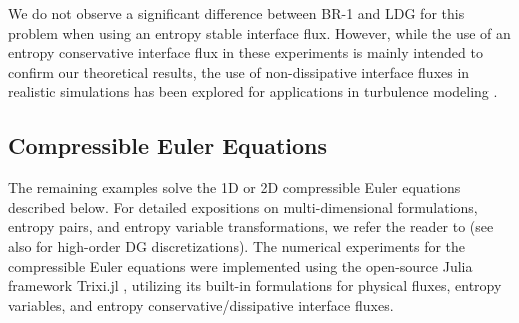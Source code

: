 \documentclass{elsarticle}
\theoremstyle{definition}
\theoremstyle{plain}
\theoremstyle{plain}
\newcommand{\reftwo}[1]{{\color{blue}#1}}
\renewcommand{\reftwo}[1]{#1}
\begin{document}
We do not observe a significant difference between BR-1 and LDG for this problem when using an entropy stable interface flux. However, while the use of an entropy conservative interface flux in these experiments is mainly intended to confirm our theoretical results, the use of non-dissipative interface fluxes in realistic simulations has been explored for applications in turbulence modeling \cite{flad2017use}.


\subsection{Compressible Euler Equations}\label{sec:Compressible Euler Equations}
The remaining examples solve the 1D or 2D compressible Euler equations described below. 
\reftwo{For detailed expositions on multi-dimensional formulations, entropy pairs, and 
entropy variable transformations, we refer the reader to \cite{ harten1983symmetric, hughes1986new, tadmor2003entropy} 
(see also \cite{chan2022entropy} for high-order DG discretizations). The numerical experiments for the compressible Euler equations were implemented using the open-source Julia framework Trixi.jl \cite{ranocha2022adaptive}, utilizing its built-in formulations for physical fluxes, entropy variables, and entropy conservative/dissipative interface fluxes.} 
\end{document}
